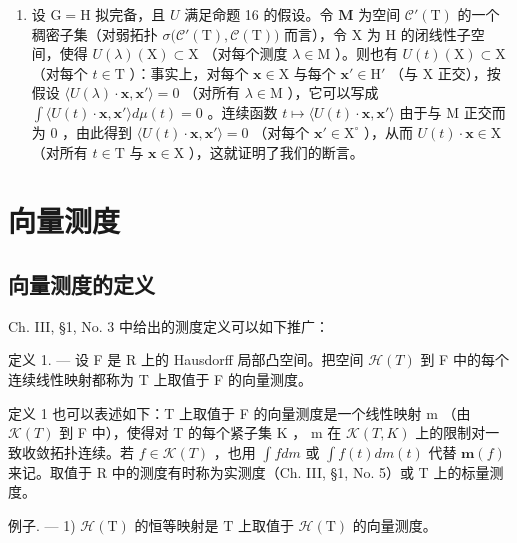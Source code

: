 \begin{enumerate}
\def\labelenumi{\arabic{enumi})}
\setcounter{enumi}{1}
\tightlist
\item
  设 \(\mathrm{G} = \mathrm{H}\) 拟完备，且 \(U\) 满足命题 16 的假设。令 \(\mathbf{M}\) 为空间 \(\mathcal{C}'(\mathrm{T})\) 的一个稠密子集（对弱拓扑 \(\sigma\big(\mathcal{C}'(\mathrm{T}),\mathcal{C}(\mathrm{T})\big)\) 而言），令 \(\mathrm{X}\) 为 \(\mathrm{H}\) 的闭线性子空间，使得 \(U(\lambda)(\mathrm{X})\subset \mathrm{X}\) （对每个测度 \(\lambda \in \mathrm{M}\) ）。则也有 \(U(t)(\mathrm{X})\subset \mathrm{X}\) （对每个 \(t\in \mathrm{T}\) ）：事实上，对每个 \(\mathbf{x}\in \mathrm{X}\) 与每个 \(\mathbf{x}'\in \mathrm{H}'\) （与 \(\mathrm{X}\) 正交），按假设 \(\langle U(\lambda)\cdot \mathbf{x},\mathbf{x}'\rangle = 0\) （对所有 \(\lambda \in \mathrm{M}\) ），它可以写成 \(\int \langle U(t)\cdot \mathbf{x},\mathbf{x}'\rangle d\mu (t) = 0\) 。连续函数 \(t\mapsto \langle U(t)\cdot \mathbf{x},\mathbf{x}'\rangle\) 由于与 \(\mathrm{M}\) 正交而为 0 ，由此得到 \(\langle U(t)\cdot \mathbf{x},\mathbf{x}'\rangle = 0\) （对每个 \(\mathbf{x}'\in \mathrm{X}^\circ\) ），从而 \(U(t)\cdot \mathbf{x}\in \mathrm{X}\) （对所有 \(t\in \mathrm{T}\) 与 \(\mathbf{x}\in \mathrm{X}\) ），这就证明了我们的断言。
\end{enumerate}

\section{向量测度}

\subsection{向量测度的定义}

Ch. III, §1, No. 3 中给出的测度定义可以如下推广：

定义 1. --- 设 F 是 R 上的 Hausdorff 局部凸空间。把空间 \(\mathcal{H}(T)\) 到 F 中的每个连续线性映射都称为 T 上取值于 F 的向量测度。

定义 1 也可以表述如下：T 上取值于 F 的向量测度是一个线性映射 m （由 \(\mathcal{K}(T)\) 到 F 中），使得对 T 的每个紧子集 K ， m 在 \(\mathcal{K}(T,K)\) 上的限制对一致收敛拓扑连续。若 \(f \in \mathcal{K}(T)\) ，也用 \(\int f dm\) 或 \(\int f(t) dm(t)\) 代替 \(\mathbf{m}(f)\) 来记。取值于 R 中的测度有时称为实测度（Ch. III, §1, No. 5）或 T 上的标量测度。

例子. --- 1) \(\mathcal{H}(\mathrm{T})\) 的恒等映射是 \(\mathrm{T}\) 上取值于 \(\mathcal{H}(\mathrm{T})\) 的向量测度。

